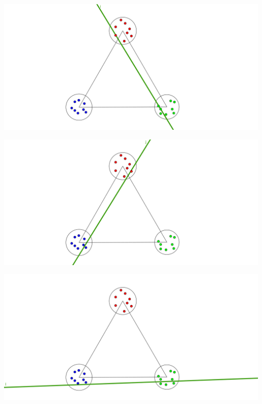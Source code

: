 \documentclass[xcolor=table]{beamer}
\begin{document}
\begin{mdframe}%

\noindent{}\includegraphics[keepaspectratio=true,width=\dimwidth{1.00},height=\dimheight{1.00}]{images/non_trivial_cut02}{}%
\end{mdframe}%

\begin{mdframe}%

\noindent{}\includegraphics[keepaspectratio=true,width=\dimwidth{1.00},height=\dimheight{1.00}]{images/non_trivial_cut03}{}%
\end{mdframe}%

\begin{mdframe}%

\noindent{}\includegraphics[keepaspectratio=true,width=\dimwidth{1.00},height=\dimheight{1.00}]{images/non_trivial_cut04}{}%
\end{mdframe}%
\end{document}
